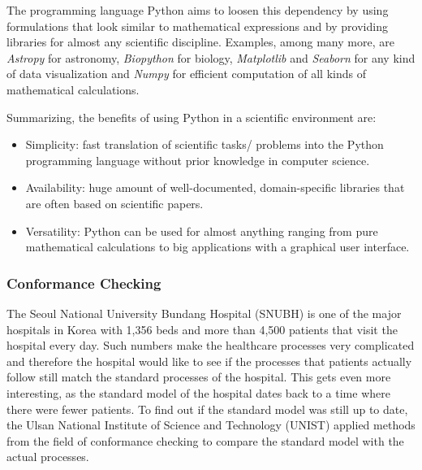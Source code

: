 \documentclass{article}
\begin{document}
The programming language Python aims to loosen this dependency by using formulations that look similar to mathematical expressions and by providing libraries for almost any scientific discipline. Examples, among many more, are \textit{Astropy} for astronomy, \textit{Biopython} for biology, \textit{Matplotlib} and \textit{Seaborn} for any kind of data visualization and \textit{Numpy} for efficient computation of all kinds of mathematical calculations.

Summarizing, the benefits of using Python in a scientific environment are:

\begin{itemize}
    \item Simplicity: fast translation of scientific tasks/ problems into the Python programming language without prior knowledge in computer science.
    \item Availability: huge amount of well-documented, domain-specific libraries that are often based on scientific papers.
    \item Versatility: Python can be used for almost anything ranging from pure mathematical calculations to big applications with a graphical user interface.
\end{itemize}

\subsubsection{Conformance Checking}

The Seoul National University Bundang Hospital (SNUBH) is one of the major hospitals in Korea with 1,356 beds and more than 4,500 patients that visit the hospital every day. Such numbers make the healthcare processes very complicated and therefore the hospital would like to see if the processes that patients actually follow still match the standard processes of the hospital. This gets even more interesting, as the standard model of the hospital dates back to a time where there were fewer patients. To find out if the standard model was still up to date, the Ulsan National Institute of Science and Technology (UNIST) applied methods from the field of conformance checking to compare the standard model with the actual processes. \cite{case_study_2014}
\end{document}
